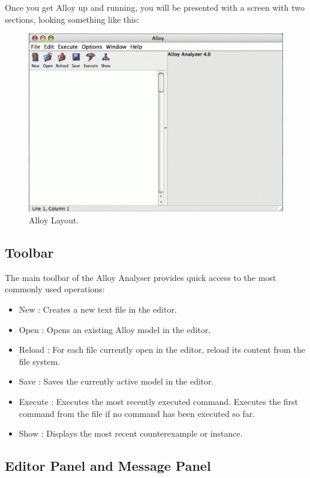 \documentclass[a4paper,12pt]{report}
\begin{document}
\begin{onehalfspacing}
Once you get Alloy up and running, you will be presented with a screen with two sections, looking something like this:

 \begin{figure}[ht!]
\centering
 \includegraphics[width= 1.0\textwidth]{alloyblank}
\caption{Alloy Layout.}
 \end{figure}
 
\subsection{Toolbar}
\label{Tools}

The main toolbar of the Alloy Analyser provides quick access to the most commonly used operations:
\begin{itemize}
\item New : Creates a new text file in the editor.
\item Open : Opens an existing Alloy model in the editor.
\item Reload : For each file currently open in the editor, reload its content from the file system.
\item Save : Saves the currently active model in the editor.
\item Execute : Executes the most recently executed command. Executes the first command from the file if no command has been executed so far.
\item Show : Displays the most recent counterexample or instance.
\end{itemize}

\subsection{Editor Panel and Message Panel}
\label{Editor and Message Panel}


\end{onehalfspacing}
\end{document}
